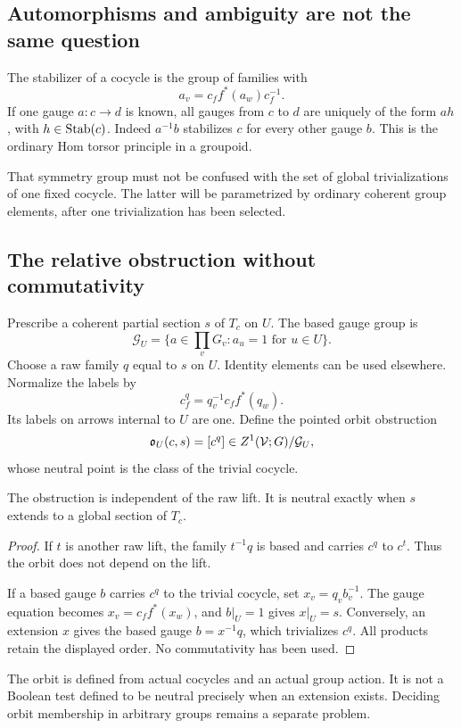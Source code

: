 \subsection{Automorphisms and ambiguity are not the same question}
The stabilizer of a cocycle is the group of families with
\[
 a_v=c_f f^*(a_w)c_f^{-1}.
\]
If one gauge \(a:c\to d\) is known, all gauges from \(c\) to \(d\) are uniquely of the form \(ah\), with \(h\in\operatorname{Stab}(c)\). Indeed \(a^{-1}b\) stabilizes \(c\) for every other gauge \(b\). This is the ordinary Hom torsor principle in a groupoid.

That symmetry group must not be confused with the set of global trivializations of one fixed cocycle. The latter will be parametrized by ordinary coherent group elements, after one trivialization has been selected.

\subsection{The relative obstruction without commutativity}
Prescribe a coherent partial section \(s\) of \(T_c\) on \(U\). The based gauge group is
\[
 \mathcal G_U=\{a\in\prod_vG_v:a_u=1\text{ for }u\in U\}.
\]
Choose a raw family \(q\) equal to \(s\) on \(U\). Identity elements can be used elsewhere. Normalize the labels by
\[
 c^q_f=q_v^{-1}c_f f^*(q_w).
\]
Its labels on arrows internal to \(U\) are one. Define the pointed orbit obstruction
\[
 \mathfrak o_U(c,s)=[c^q]\in Z^1(\mathcal V;G)/\mathcal G_U,
\]
whose neutral point is the class of the trivial cocycle.

\begin{theorem}\label{KS31}
The obstruction is independent of the raw lift. It is neutral exactly when \(s\) extends to a global section of \(T_c\).
\end{theorem}
\begin{proof}
If \(t\) is another raw lift, the family \(t^{-1}q\) is based and carries \(c^q\) to \(c^t\). Thus the orbit does not depend on the lift.

If a based gauge \(b\) carries \(c^q\) to the trivial cocycle, set \(x_v=q_vb_v^{-1}\). The gauge equation becomes \(x_v=c_f f^*(x_w)\), and \(b|_U=1\) gives \(x|_U=s\). Conversely, an extension \(x\) gives the based gauge \(b=x^{-1}q\), which trivializes \(c^q\). All products retain the displayed order. No commutativity has been used.
\end{proof}
The orbit is defined from actual cocycles and an actual group action. It is not a Boolean test defined to be neutral precisely when an extension exists. Deciding orbit membership in arbitrary groups remains a separate problem.

